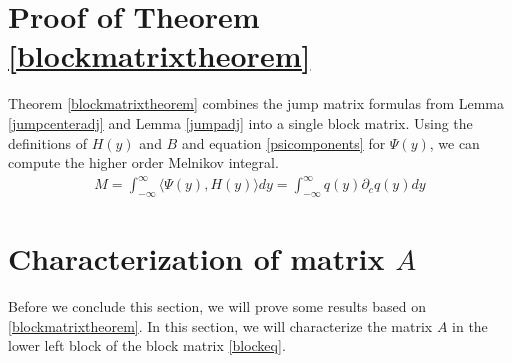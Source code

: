 \documentclass[thesis.tex]{subfiles}
\begin{document}
\section{Proof of Theorem \ref{blockmatrixtheorem}}

Theorem \ref{blockmatrixtheorem} combines the jump matrix formulas from Lemma \ref{jumpcenteradj} and Lemma \ref{jumpadj} into a single block matrix. Using the definitions of $H(y)$ and $B$ and equation \cref{psicomponents} for $\Psi(y)$, we can compute the higher order Melnikov integral.
\begin{align*}
M = \int_{-\infty}^\infty \langle \Psi(y), H(y) \rangle dy = \int_{-\infty}^\infty q(y) \partial_c q(y) dy
\end{align*}

\section{Characterization of matrix $A$}

Before we conclude this section, we will prove some results based on \cref{blockmatrixtheorem}. In this section, we will characterize the matrix $A$ in the lower left block of the block matrix \cref{blockeq}. 
\end{document}

